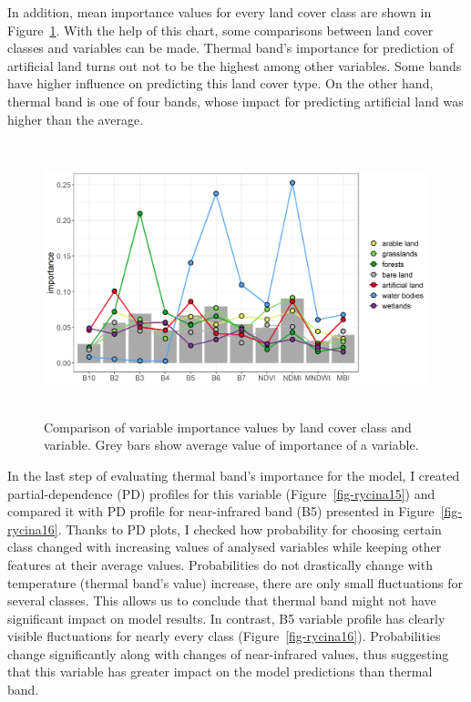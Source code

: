 \documentclass{amuthesis}
\begin{document}
In addition, mean importance values for every land cover class are shown
in Figure~\ref{fig-rycina14a}. With the help of this chart, some
comparisons between land cover classes and variables can be made.
Thermal band's importance for prediction of artificial land turns out
not to be the highest among other variables. Some bands have higher
influence on predicting this land cover type. On the other hand, thermal
band is one of four bands, whose impact for predicting artificial land
was higher than the average.

\begin{figure}[H]

{\centering \includegraphics[width=5.59375in,height=3.125in]{./figures/importance_comparison.png}

}

\caption{\label{fig-rycina14a}Comparison of variable importance values
by land cover class and variable. Grey bars show average value of
importance of a variable.}

\end{figure}

In the last step of evaluating thermal band's importance for the model,
I created partial-dependence (PD) profiles for this variable
(Figure~\ref{fig-rycina15}) and compared it with PD profile for
near-infrared band (B5) presented in Figure~\ref{fig-rycina16}. Thanks
to PD plots, I checked how probability for choosing certain class
changed with increasing values of analysed variables while keeping other
features at their average values. Probabilities do not drastically
change with temperature (thermal band's value) increase, there are only
small fluctuations for several classes. This allows us to conclude that
thermal band might not have significant impact on model results. In
contrast, B5 variable profile has clearly visible fluctuations for
nearly every class (Figure~\ref{fig-rycina16}). Probabilities change
significantly along with changes of near-infrared values, thus
suggesting that this variable has greater impact on the model
predictions than thermal band.
\end{document}
